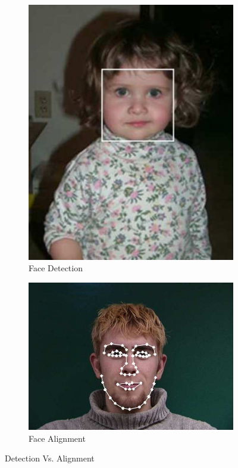 \documentclass[12pt]{report}
\begin{document}
\begin{figure}[h!]
    \centering
    \begin{subfigure}{0.5\textwidth}
      \centering
      \includegraphics{../img/17_1.png}
      \caption{Face Detection}
      \label{fig:sub1}
    \end{subfigure}%
    \begin{subfigure}{0.5\textwidth}
      \centering
      \includegraphics{../img/17_2.png}
      \caption{Face Alignment}
      \label{fig:sub2}
    \end{subfigure}
    \caption{Detection Vs. Alignment}
    \label{fig:test}
\end{figure}
\end{document}
